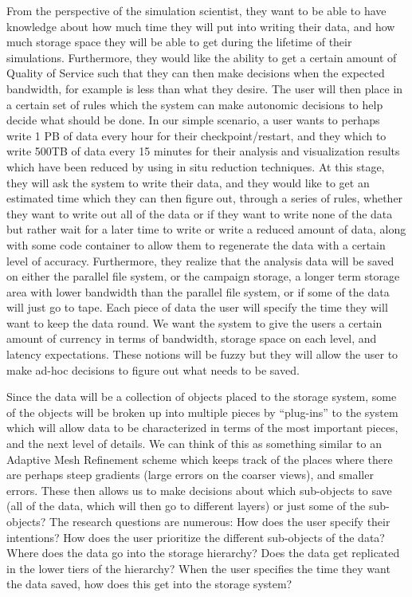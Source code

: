 From the perspective of the simulation scientist, they want to be able to have knowledge about how much time they will 
put into writing their data, and how much storage space they will be able to get during the lifetime of their simulations. Furthermore, they
would like the ability to get a certain amount of Quality of Service such that they can then make decisions when the expected bandwidth, for example
is less than what they desire. The user will then place in a certain set of rules which the system can make autonomic decisions to help decide what
should be done. In our simple scenario, a user wants to perhaps write 1 PB of data every hour for their checkpoint/restart, and they which to write 500TB of data
every 15 minutes for their analysis and visualization results which have been reduced by using in situ reduction techniques. At this stage, they will ask the system
to write their data, and they would like to get an estimated time which they can then figure out, through a series of rules, whether they want to write out all of the
data or if they want to write none of the data but rather wait for a later time to write or write a reduced amount of data, along with some code container to allow them 
to regenerate the data with a certain level of accuracy. Furthermore, they realize that the analysis data will be saved on either the parallel file system, or the campaign storage,
a longer term storage area with lower bandwidth than the parallel file system, or if some of the data will just go to tape. Each piece of data the user will specify the
time they will want to keep the data round. We want the system to give the users a certain amount of currency in terms of bandwidth, storage space on each level, and latency expectations.
These notions will be fuzzy but they will allow the user to make ad-hoc decisions to figure out what needs to be saved.

Since the data will be a collection of objects placed to the storage system, some of the objects will be broken up into multiple pieces by ``plug-ins'' to the system
which will allow data to be characterized in terms of the most important pieces, and the next level of details. We can think of this as something similar to an Adaptive Mesh Refinement scheme
which keeps track of the places where there are perhaps steep gradients (large errors on the coarser views), and smaller errors.  These then allows us to make decisions about which 
sub-objects to save (all of the data, which will then go to different layers) or just some of the sub-objects?  The research questions are numerous: How does the user specify their intentions? 
How does the user prioritize the different sub-objects of the data? Where does the data go into the storage hierarchy? Does the data get replicated in the lower tiers of the hierarchy? 
When the user specifies the time they want the data saved, how does this get into the storage system?

